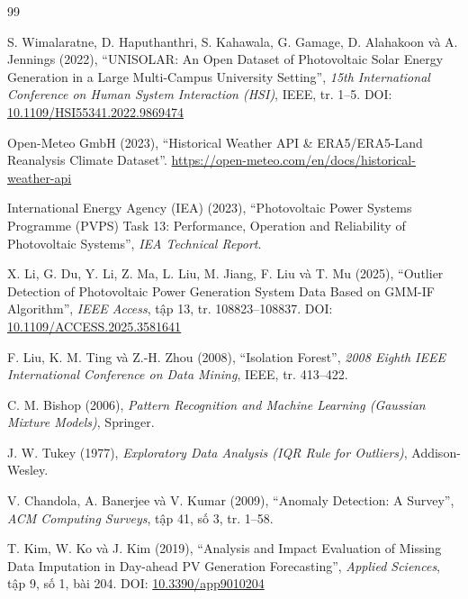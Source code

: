\documentclass[12pt, a4paper]{report}
\begin{document}
\newpage
\begin{thebibliography}{99}

S. Wimalaratne, D. Haputhanthri, S. Kahawala, G. Gamage, D. Alahakoon và A. Jennings (2022),
``UNISOLAR: An Open Dataset of Photovoltaic Solar Energy Generation in a Large Multi-Campus University Setting'',
\textit{15th International Conference on Human System Interaction (HSI)}, IEEE, tr. 1--5.
DOI: \href{https://doi.org/10.1109/HSI55341.2022.9869474}{10.1109/HSI55341.2022.9869474}

Open-Meteo GmbH (2023),
``Historical Weather API \& ERA5/ERA5-Land Reanalysis Climate Dataset''.
\url{https://open-meteo.com/en/docs/historical-weather-api}

International Energy Agency (IEA) (2023),
``Photovoltaic Power Systems Programme (PVPS) Task 13: Performance, Operation and Reliability of Photovoltaic Systems'',
\textit{IEA Technical Report}.

X. Li, G. Du, Y. Li, Z. Ma, L. Liu, M. Jiang, F. Liu và T. Mu (2025),
``Outlier Detection of Photovoltaic Power Generation System Data Based on GMM-IF Algorithm'',
\textit{IEEE Access}, tập 13, tr. 108823--108837.
DOI: \href{https://doi.org/10.1109/ACCESS.2025.3581641}{10.1109/ACCESS.2025.3581641}

F. Liu, K. M. Ting và Z.-H. Zhou (2008),
``Isolation Forest'',
\textit{2008 Eighth IEEE International Conference on Data Mining}, IEEE, tr. 413--422.

C. M. Bishop (2006),
\textit{Pattern Recognition and Machine Learning (Gaussian Mixture Models)}, Springer.

J. W. Tukey (1977),
\textit{Exploratory Data Analysis (IQR Rule for Outliers)}, Addison-Wesley.

V. Chandola, A. Banerjee và V. Kumar (2009),
``Anomaly Detection: A Survey'',
\textit{ACM Computing Surveys}, tập 41, số 3, tr. 1--58.

T. Kim, W. Ko và J. Kim (2019),
``Analysis and Impact Evaluation of Missing Data Imputation in Day-ahead PV Generation Forecasting'',
\textit{Applied Sciences}, tập 9, số 1, bài 204.
DOI: \href{https://doi.org/10.3390/app9010204}{10.3390/app9010204}


\end{thebibliography}
\end{document}
